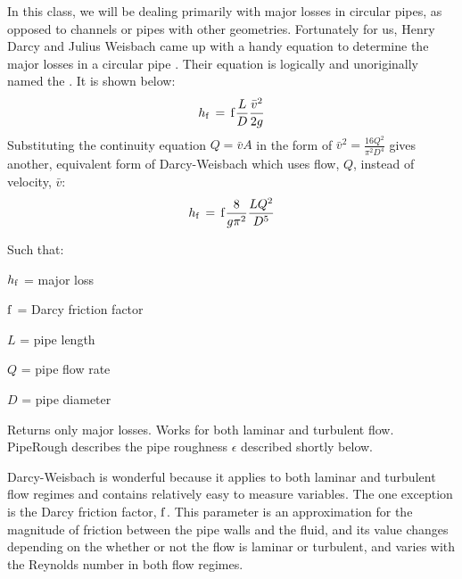 \documentclass[letterpaper,10pt,english]{sphinxmanual}
\begin{document}
In this class, we will be dealing primarily with major losses in circular pipes, as opposed to channels or pipes with other geometries. Fortunately for us, Henry Darcy and Julius Weisbach came up with a handy equation to determine the major losses in a circular pipe . Their equation is logically and unoriginally named the . It is shown below:
\begin{equation}\label{equation:Fluids_Review/Fluids_Review_Design:Fluids_Review/Fluids_Review_Design:9}
\begin{split}h_{\rm{f}} \, = \, {\rm{f}} \frac{L}{D} \frac{\bar v^2}{2g}\end{split}
\end{equation}
Substituting the continuity equation \(Q = \bar vA\) in the form of \(\bar v^2 = \frac{16Q^2}{\pi^2 D^4}\) gives another, equivalent form of Darcy-Weisbach which uses flow, \(Q\), instead of velocity, \(\bar v\):
\begin{equation}\label{equation:Fluids_Review/Fluids_Review_Design:Fluids_Review/Fluids_Review_Design:10}
\begin{split}h_{\rm{f}} \, = \,{\rm{f}} \frac{8}{g \pi^2} \frac{LQ^2}{D^5}\end{split}
\end{equation}
\begin{DUlineblock}{0em}
\item[] Such that:
\item[] \(h_{\rm{f}}\) = major loss
\item[] \(\rm{f}\) = Darcy friction factor
\item[] \(L\) = pipe length
\item[] \(Q\) = pipe flow rate
\item[] \(D\) = pipe diameter
\end{DUlineblock}




  Returns only major losses. Works for both laminar and turbulent flow. PipeRough describes the pipe roughness \(\epsilon\) described shortly below.



Darcy-Weisbach is wonderful because it applies to both laminar and turbulent flow regimes and contains relatively easy to measure variables. The one exception is the Darcy friction factor, \(\rm{f}\). This parameter is an approximation for the magnitude of friction between the pipe walls and the fluid, and its value changes depending on the whether or not the flow is laminar or turbulent, and varies with the Reynolds number in both flow regimes.
\end{document}

